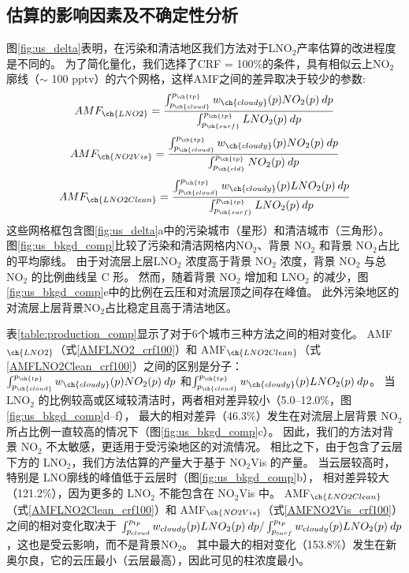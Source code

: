 \subsection{估算的影响因素及不确定性分析} \label{sec:uncertainty}

图\ref{fig:us_delta}表明，在污染和清洁地区我们方法对于LNO$_2$产率估算的改进程度是不同的。
为了简化量化，我们选择了CRF = 100\%的条件，具有相似云上NO$_2$廓线（$\sim$ 100 pptv）的六个网格，这样AMF之间的差异取决于较少的参数:
\begin{equation} \label{AMFLNO2_crf100}
AMF_{\ch{LNO2}} = \frac{\int_{p_{\ch{cloud}}}^{p_{\ch{tp}}} w_{\ch{cloudy}}(p) NO_2(p) \: dp}{\int_{p_{\ch{surf}}}^{p_{\ch{tp}}} LNO_2(p) \: dp}
\end{equation}
\begin{equation} \label{AMFNO2Vis_crf100}
AMF_{\ch{NO2Vis}} = \frac{\int_{p_{\ch{cloud}}}^{p_{\ch{tp}}} w_{\ch{cloudy}}(p) NO_2(p) \: dp}{\int_{p_{\ch{cld}}}^{p_{\ch{tp}}} NO_2(p) \: dp}
\end{equation}
\begin{equation} \label{AMFLNO2Clean_crf100}
AMF_{\ch{LNO2Clean}} = \frac{\int_{p_{\ch{cloud}}}^{p_{\ch{tp}}} w_{\ch{cloudy}}(p) LNO_2(p) \: dp}{\int_{p_{\ch{surf}}}^{p_{\ch{tp}}} LNO_2(p) \: dp}
\end{equation}
这些网格框包含图\ref{fig:us_delta}a中的污染城市（星形）和清洁城市（三角形）。
图\ref{fig:us_bkgd_comp}比较了污染和清洁网格内NO$_2$、背景 NO$_2$ 和背景 NO$_2$占比的平均廓线。
由于对流层上层LNO$_2$ 浓度高于背景 NO$_2$ 浓度，背景 NO$_2$ 与总 NO$_2$ 的比例曲线呈 C 形。
然而，随着背景 NO$_2$ 增加和 LNO$_2$ 的减少，图\ref{fig:us_bkgd_comp}e中的比例在云压和对流层顶之间存在峰值。
此外污染地区的对流层上层背景NO$_2$占比稳定且高于清洁地区。

表\ref{table:production_comp}显示了对于6个城市三种方法之间的相对变化。
AMF$_{\ch{LNO2}}$（式\ref{AMFLNO2_crf100}）和 AMF$_{\ch{LNO2Clean}}$（式\ref{AMFLNO2Clean_crf100}）之间的区别是分子：
$\int_{p_{\ch{cloud}}}^{p_{\ch{tp}}} w_{\ch{cloudy}}(p) NO_2(p) \: dp$
和$\int_{p_{\ch{cloud}}}^{p_{\ch{tp}}} w_{\ch{cloudy}}(p) LNO_2(p) \: dp$。
当 LNO$_2$ 的比例较高或区域较清洁时，两者相对差异较小（5.0--12.0\%，图\ref{fig:us_bkgd_comp}d--f），
最大的相对差异（46.3\%）发生在对流层上层背景 NO$_2$ 所占比例一直较高的情况下（图\ref{fig:us_bkgd_comp}c）。
因此，我们的方法对背景 NO$_2$ 不太敏感，更适用于受污染地区的对流情况。
相比之下，由于包含了云层下方的 LNO$_2$，我们方法估算的产量大于基于 NO$_2$Vis 的产量。
当云层较高时，特别是 LNO廓线的峰值低于云层时（图\ref{fig:us_bkgd_comp}b），
相对差异较大（121.2\%），因为更多的 LNO$_2$ 不能包含在 NO$_2$Vis 中。
AMF$_{\ch{LNO2Clean}}$（式\ref{AMFLNO2Clean_crf100}）和 AMF$_{\ch{NO2Vis}}$（式\ref{AMFNO2Vis_crf100}）之间的相对变化取决于
$\int_{p_{\textrm cloud}}^{p_{\textrm tp}} w_{\textrm cloudy}(p) LNO_2(p) \: dp / \int_{p_{\textrm surf}}^{p_{\textrm tp}} w_{\textrm cloudy}(p) LNO_2(p) \: dp$，这也是受云影响，而不是背景NO$_2$。
其中最大的相对变化（153.8\%）发生在新奥尔良，它的云压最小（云层最高），因此可见的柱浓度最小。

